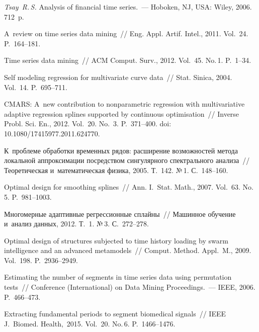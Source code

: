 \begin{multicols}{2}
{{\begin{thebibliography}{99}
\textit{Tsay~R.\,S.} Analysis of financial time series.~--- 
Hoboken, NJ, USA:  Wiley, 2006. 712~p.


 A~review on time series data mining~// 
Eng. Appl. Artif. Intel., 2011. Vol.~24. P.~164--181.

 Time series data mining~// 
ACM Comput. Surv., 2012. Vol.~45. No.\,1. P.~1--34.


Self modeling regression for multivariate curve data~// 
Stat. Sinica, 2004. Vol.~14. P.~695--711.

CMARS: A~new contribution to nonparametric regression 
with multivariative adaptive regression splines supported by continuous optimisation~// 
Inverse Probl.  Sci.  En., 2012. Vol.~20. No.~3. P.~371--400.
doi: 10.1080/17415977.2011.624770.


К~проблеме обработки временных рядов: расширение возможностей метода 
локальной аппроксимации посредством сингулярного спектрального анализа~// 
Теоретическая и~математическая физика, 2005. Т.~142. №\,1. С.~148--160.


 Optimal design for smoothing splines~// 
Ann. I.~Stat. Math., 2007. Vol.~63. No.\,5. P.~981--1003.

 Многомерные адаптивные регрессионные сплайны~// 
Машинное обучение и~анализ данных, 2012. Т.~1. №\,3. С.~272--278.


 Optimal design of structures subjected 
to time history loading by swarm intelligence and an advanced metamodels~// 
Comput. Method. Appl.~M., 2009. Vol.~198. P.~2936--2949.

 Estimating the number of segments in 
time series data using permutation tests~//  Conference 
(International) on Data Mining Proceedings.~--- IEEE, 2006. P.~466--473.

Extracting fundamental periods to segment biomedical signals~// IEEE J.~Biomed. 
Health,~2015. Vol.~20. No.\,6. P.~1466--1476.
 \end{thebibliography}

 }
 }

\end{multicols}

